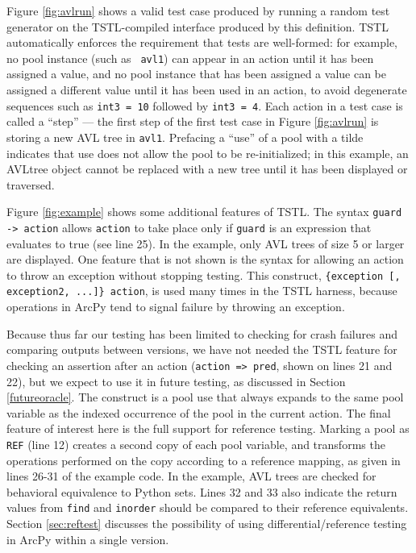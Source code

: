 Figure \ref{fig:avlrun} shows a valid test case produced by
running a random test generator on the TSTL-compiled interface
produced by this definition.  TSTL automatically enforces the requirement that
tests are well-formed: for example, no pool instance (such as {\tt
  avl1}) can appear in an action until it has been assigned a value,
and no pool instance that has been assigned a value can be assigned a
different value until it has been used in an action, to avoid
degenerate sequences such as {\tt int3 = 10} followed by {\tt int3 =
  4}.  Each action in a test case is called a ``step'' --- the first
step of the first test case in Figure \ref{fig:avlrun} is storing a
new AVL tree in {\tt avl1}.  Prefacing a ``use'' of a pool with a
tilde {\tt ~} indicates that use does not allow the pool to be
re-initialized; in this example, an AVLtree object cannot be replaced
with a new tree until it has been displayed or traversed.

Figure \ref{fig:example} shows some additional features
of TSTL.  The syntax {\tt guard -> action} allows {\tt action} to take
place only if {\tt guard} is an expression that evaluates to true (see
line 25).  In the example, only AVL trees of size 5 or larger are
displayed.  One feature that is not shown is the syntax for allowing
an action to throw an exception without stopping testing. This
construct, {\tt \{exception [, exception2, ...]\} action}, is used
many times in the TSTL harness, because operations in ArcPy tend to
signal failure by throwing an exception.

Because thus far our testing
has been limited to checking for crash failures and comparing outputs
between versions, we have not needed the TSTL feature for checking an
assertion after an action ({\tt action => pred}, shown on lines 21 and
22), but we expect to use it in future testing, as discussed in Section
\ref{futureoracle}.  The construct {\tt <avl,1>} is a pool use that
always expands to the same pool variable as the indexed occurrence of
the pool in the current action.  The final feature of interest here is the full
support for reference testing.  Marking a pool as {\tt REF} (line 12) creates a
second copy of each pool variable, and transforms the operations
performed on the copy according to a reference mapping, as given in
lines 26-31 of the example code.  In the example, AVL trees are
checked for behavioral equivalence to Python sets.  Lines 32 and 33
also indicate the return values from {\tt find} and {\tt inorder}
should be compared to their reference equivalents.  Section
\ref{sec:reftest} discusses the possibility of using
differential/reference testing \cite{Differential,ICSEDiff} in ArcPy
within a single version.
